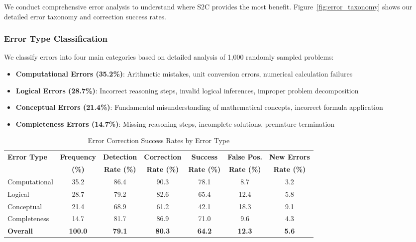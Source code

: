 \documentclass[10pt,twocolumn]{article}
\newcommand{\toprule}{\hline\hline}
\newcommand{\midrule}{\hline}
\newcommand{\bottomrule}{\hline\hline}
\newcommand{\ssc}{\textsc{S2C}}
\begin{document}
We conduct comprehensive error analysis to understand where \ssc{} provides the most benefit. Figure~\ref{fig:error_taxonomy} shows our detailed error taxonomy and correction success rates.

\subsubsection{Error Type Classification}

We classify errors into four main categories based on detailed analysis of 1,000 randomly sampled problems:

\begin{itemize}[leftmargin=*]
\item \textbf{Computational Errors (35.2\%)}: Arithmetic mistakes, unit conversion errors, numerical calculation failures
\item \textbf{Logical Errors (28.7\%)}: Incorrect reasoning steps, invalid logical inferences, improper problem decomposition
\item \textbf{Conceptual Errors (21.4\%)}: Fundamental misunderstanding of mathematical concepts, incorrect formula application
\item \textbf{Completeness Errors (14.7\%)}: Missing reasoning steps, incomplete solutions, premature termination
\end{itemize}

\begin{table}[t]
\centering
\caption{Error Correction Success Rates by Error Type}
\label{tab:error_correction}
\begin{tabular}{@{}lcccccc@{}}
\toprule
\textbf{Error Type} & \textbf{Frequency} & \textbf{Detection} & \textbf{Correction} & \textbf{Success} & \textbf{False Pos.} & \textbf{New Errors} \\
 & \textbf{(\%)} & \textbf{Rate (\%)} & \textbf{Rate (\%)} & \textbf{Rate (\%)} & \textbf{Rate (\%)} & \textbf{Rate (\%)} \\
\midrule
Computational & 35.2 & 86.4 & 90.3 & 78.1 & 8.7 & 3.2 \\
Logical & 28.7 & 79.2 & 82.6 & 65.4 & 12.4 & 5.8 \\
Conceptual & 21.4 & 68.9 & 61.2 & 42.1 & 18.3 & 9.1 \\
Completeness & 14.7 & 81.7 & 86.9 & 71.0 & 9.6 & 4.3 \\
\midrule
\textbf{Overall} & \textbf{100.0} & \textbf{79.1} & \textbf{80.3} & \textbf{64.2} & \textbf{12.3} & \textbf{5.6} \\
\bottomrule
\end{tabular}
\end{table}
\end{document}
